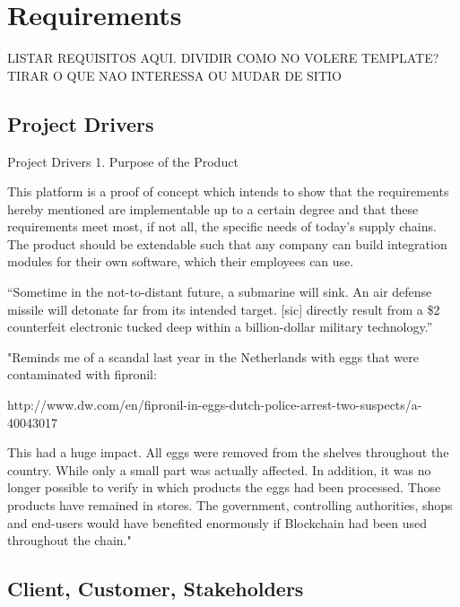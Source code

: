 
\section{Requirements}

LISTAR REQUISITOS AQUI. DIVIDIR COMO NO VOLERE TEMPLATE? TIRAR O QUE NAO INTERESSA OU MUDAR DE SITIO



\subsection{Project Drivers}

Project Drivers
	1. Purpose of the Product

	This platform is a proof of concept which intends to show that the requirements hereby mentioned are implementable up to a certain degree and that these requirements meet most, if not all, the specific needs of today's supply chains. The product should be extendable such that any company can build integration modules for their own software, which their employees can use.
	
	“Sometime in the not-to-distant future, a submarine will sink. An air defense missile will detonate far from its intended target. [sic] directly result from a \$2 counterfeit electronic tucked deep within a billion-dollar military technology.”
	
	"Reminds me of a scandal last year in the Netherlands with eggs that were contaminated with fipronil:
	
	http://www.dw.com/en/fipronil-in-eggs-dutch-police-arrest-two-suspects/a-40043017
	
	This had a huge impact. All eggs were removed from the shelves throughout the country. While only a small part was actually affected. In addition, it was no longer possible to verify in which products the eggs had been processed. Those products have remained in stores. The government, controlling authorities, shops and end-users would have benefited enormously if Blockchain had been used throughout the chain."
	
\subsection{Client, Customer, Stakeholders}
	
